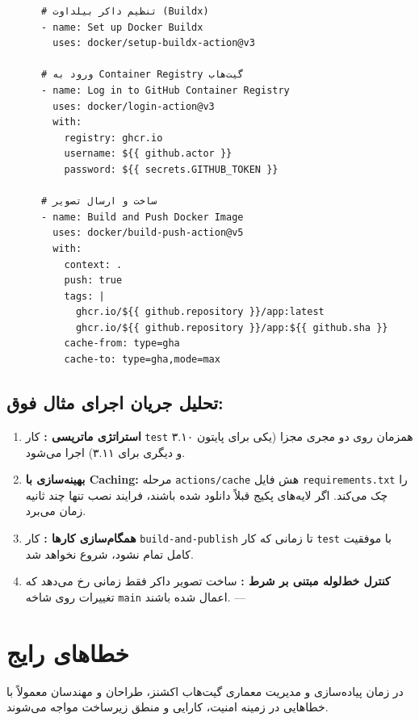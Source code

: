 \documentclass[12pt,a4paper,openany]{book}
\begin{document}
\begin{LTR}
\begin{verbatim}
      # تنظیم داکر بیلداوت (Buildx)
      - name: Set up Docker Buildx
        uses: docker/setup-buildx-action@v3

      # ورود به Container Registry گیت‌هاب
      - name: Log in to GitHub Container Registry
        uses: docker/login-action@v3
        with:
          registry: ghcr.io
          username: ${{ github.actor }}
          password: ${{ secrets.GITHUB_TOKEN }}

      # ساخت و ارسال تصویر
      - name: Build and Push Docker Image
        uses: docker/build-push-action@v5
        with:
          context: .
          push: true
          tags: |
            ghcr.io/${{ github.repository }}/app:latest
            ghcr.io/${{ github.repository }}/app:${{ github.sha }}
          cache-from: type=gha
          cache-to: type=gha,mode=max
\end{verbatim}
\end{LTR}

\subsection{تحلیل جریان اجرای مثال فوق:}

\begin{enumerate}
\item \textbf{استراتژی ماتریسی :} کار \texttt{test} همزمان روی دو مجری مجزا (یکی برای پایتون ۳.۱۰ و دیگری برای ۳.۱۱) اجرا می‌شود.
\item \textbf{بهینه‌سازی با Caching:} مرحله \texttt{actions/cache} هش فایل \texttt{requirements.txt} را چک می‌کند. اگر لایه‌های پکیج قبلاً دانلود شده باشند، فرایند نصب تنها چند ثانیه زمان می‌برد.
\item \textbf{همگام‌سازی کارها :} کار \texttt{build-and-publish} تا زمانی که کار \texttt{test} با موفقیت کامل تمام نشود، شروع نخواهد شد.
\item \textbf{کنترل خط‌لوله مبتنی بر شرط :} ساخت تصویر داکر فقط زمانی رخ می‌دهد که تغییرات روی شاخه \texttt{main} اعمال شده باشند.
---

\end{enumerate}
\section{خطاهای رایج}

در زمان پیاده‌سازی و مدیریت معماری گیت‌هاب اکشنز، طراحان و مهندسان معمولاً با خطاهایی در زمینه امنیت، کارایی و منطق زیرساخت مواجه می‌شوند.
\end{document}
